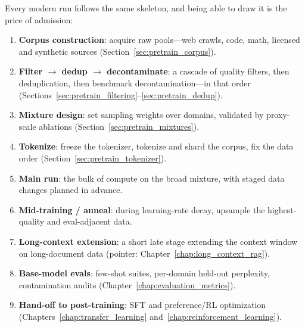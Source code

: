 \begin{keyinsight}
Every modern run follows the same skeleton, and being able to draw it is the price of admission:
\begin{enumerate}
    \item \textbf{Corpus construction}: acquire raw pools---web crawls, code, math, licensed and synthetic sources (Section~\ref{sec:pretrain_corpus}).
    \item \textbf{Filter $\rightarrow$ dedup $\rightarrow$ decontaminate}: a cascade of quality filters, then deduplication, then benchmark decontamination---in that order (Sections~\ref{sec:pretrain_filtering}--\ref{sec:pretrain_dedup}).
    \item \textbf{Mixture design}: set sampling weights over domains, validated by proxy-scale ablations (Section~\ref{sec:pretrain_mixtures}).
    \item \textbf{Tokenize}: freeze the tokenizer, tokenize and shard the corpus, fix the data order (Section~\ref{sec:pretrain_tokenizer}).
    \item \textbf{Main run}: the bulk of compute on the broad mixture, with staged data changes planned in advance.
    \item \textbf{Mid-training / anneal}: during learning-rate decay, upsample the highest-quality and eval-adjacent data.
    \item \textbf{Long-context extension}: a short late stage extending the context window on long-document data (pointer: Chapter~\ref{chap:long_context_rag}).
    \item \textbf{Base-model evals}: few-shot suites, per-domain held-out perplexity, contamination audits (Chapter~\ref{chap:evaluation_metrics}).
    \item \textbf{Hand-off to post-training}: SFT and preference/RL optimization (Chapters~\ref{chap:transfer_learning} and~\ref{chap:reinforcement_learning}).
\end{enumerate}
\end{keyinsight}

